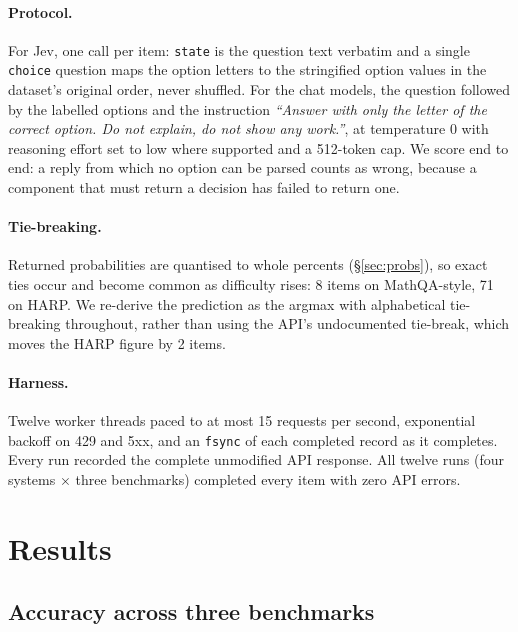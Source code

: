 \documentclass[11pt]{article}
\begin{document}
\paragraph{Protocol.}
For Jev, one call per item: \texttt{state} is the question text verbatim and a single \texttt{choice} question maps the option letters to the stringified option values in the dataset's original order, never shuffled. For the chat models, the question followed by the labelled options and the instruction \emph{``Answer with only the letter of the correct option. Do not explain, do not show any work.''}, at temperature 0 with reasoning effort set to low where supported and a 512-token cap. We score end to end: a reply from which no option can be parsed counts as wrong, because a component that must return a decision has failed to return one.

\paragraph{Tie-breaking.}
Returned probabilities are quantised to whole percents (\S\ref{sec:probs}), so exact ties occur and become common as difficulty rises: 8 items on MathQA-style, 71 on HARP. We re-derive the prediction as the argmax with alphabetical tie-breaking throughout, rather than using the API's undocumented tie-break, which moves the HARP figure by 2 items.

\paragraph{Harness.}
Twelve worker threads paced to at most 15 requests per second, exponential backoff on 429 and 5xx, and an \texttt{fsync} of each completed record as it completes. Every run recorded the complete unmodified API response. All twelve runs (four systems $\times$ three benchmarks) completed every item with zero API errors.

\section{Results}

\subsection{Accuracy across three benchmarks}
\label{sec:accuracy}
\end{document}
